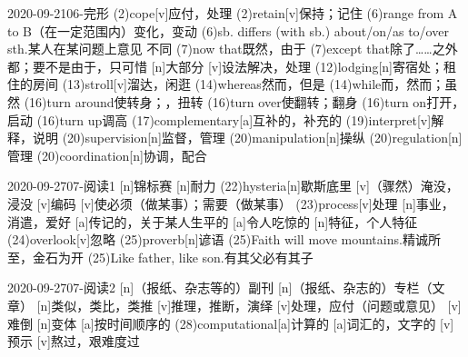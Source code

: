 \documentclass[12pt]{ctexart}
\begin{document}
\begin{wordlist}{2020-09-21}{06-完形}
  \word[2020-09-23](2){cope}[v]{应付，处理}
  \word[2020-09-25](2){retain}[v]{保持；记住}
  \word(6){range from A to B}{（在一定范围内）变化，变动}
  \word(6){sb. differs (with sb.) about/on/as to/over sth.}{某人在某问题上意见
  不同}
  \word(7){now that}{既然，由于}
  \word(7){except that}{除了……之外都；要不是由于，只可惜}
  [n]{大部分}
  [v]{设法解决，处理}
  \word(12){lodging}[n]{寄宿处；租住的房间}
  \word[2020-09-27](13){stroll}[v]{溜达，闲逛}
  \word(14){whereas}{然而，但是}
  \word(14){while}{而，然而；虽然}
  \word[2020-09-25](16){turn around}{使转身；，扭转}
  \word(16){turn over}{使翻转；翻身}
  \word(16){turn on}{打开，启动}
  \word(16){turn up}{调高}
  \word[2020-09-27](17){complementary}[a]{互补的，补充的}
  \word[2020-09-28](19){interpret}[v]{解释，说明}
  \word(20){supervision}[n]{监督，管理}
  \word[2020-09-23](20){manipulation}[n]{操纵}
  \word(20){regulation}[n]{管理}
  \word[2020-09-23](20){coordination}[n]{协调，配合}
\end{wordlist}
\begin{wordlist}{2020-09-27}{07-阅读1}
  [n]{锦标赛}
  [n]{耐力}
  \word(22){hysteria}[n]{歇斯底里}
  [v]{（骤然）淹没，浸没}
  [v]{编码}
  [v]{使必须（做某事）；需要（做某事）}
  \word(23){process}[v]{处理}
  [n]{事业，消遣，爱好}
  [a]{传记的，关于某人生平的}
  [a]{令人吃惊的}
  [n]{特征，个人特征}
  \word(24){overlook}[v]{忽略}
  \word[2020-10-27](25){proverb}[n]{谚语}
  \word(25){Faith will move mountains.}{精诚所至，金石为开}
  \word[2020-10-27](25){{Like father, like son.}}{有其父必有其子}
\end{wordlist}
\begin{wordlist}{2020-09-27}{07-阅读2}
  [n]{（报纸、杂志等的）副刊}
  [n]{（报纸、杂志的）专栏（文章）}
  [n]{类似，类比，类推}
  [v]{推理，推断，演绎}
  [v]{处理，应付（问题或意见）}
  [v]{难倒}
  [n]{变体}
  [a]{按时间顺序的}
  \word(28){computational}[a]{计算的}
  [a]{词汇的，文字的}
  [v]{预示}
  [v]{熬过，艰难度过}
\end{wordlist}
\end{document}

